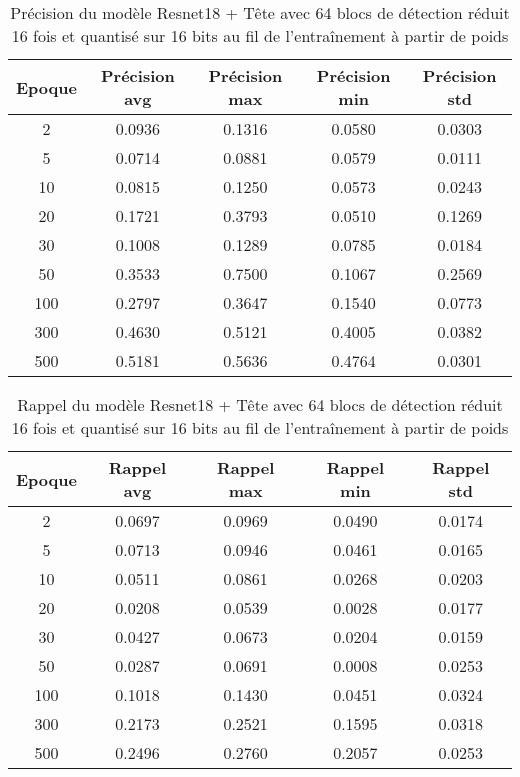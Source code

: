 \begin{table}[!ht]
    \caption{Précision du modèle Resnet18 + Tête avec 64 blocs de détection réduit 16 fois et quantisé sur 16 bits au fil de l'entraînement à partir de poids}
    \label{tab:qresnet18+head_64n_reduced_16x_precision_16b_from_weights}
    \centering
    \begin{tabular}{ |c||c|c|c|c|  }
        \hline
        \rowcolor{gray!50}
        Epoque & Précision avg & Précision max & Précision min & Précision std\\
        \hline
        2 & 0.0936 & 0.1316 & 0.0580 & 0.0303\\
        5 & 0.0714 & 0.0881 & 0.0579 & 0.0111\\
        10 & 0.0815 & 0.1250 & 0.0573 & 0.0243\\
        20 & 0.1721 & 0.3793 & 0.0510 & 0.1269\\
        30 & 0.1008 & 0.1289 & 0.0785 & 0.0184\\
        50 & 0.3533 & 0.7500 & 0.1067 & 0.2569\\
        100 & 0.2797 & 0.3647 & 0.1540 & 0.0773\\
        300 & 0.4630 & 0.5121 & 0.4005 & 0.0382\\
        500 & 0.5181 & 0.5636 & 0.4764 & 0.0301\\
        \hline
    \end{tabular}
\end{table}

\begin{table}[!ht]
    \caption{Rappel du modèle Resnet18 + Tête avec 64 blocs de détection réduit 16 fois et quantisé sur 16 bits au fil de l'entraînement à partir de poids}
    \label{tab:qresnet18+head_64n_reduced_16x_rappel_16b_from_weights}
    \centering
    \begin{tabular}{ |c||c|c|c|c|  }
        \hline
        \rowcolor{gray!50}
        Epoque & Rappel avg & Rappel max & Rappel min & Rappel std\\
        \hline
        2 & 0.0697 & 0.0969 & 0.0490 & 0.0174\\
        5 & 0.0713 & 0.0946 & 0.0461 & 0.0165\\
        10 & 0.0511 & 0.0861 & 0.0268 & 0.0203\\
        20 & 0.0208 & 0.0539 & 0.0028 & 0.0177\\
        30 & 0.0427 & 0.0673 & 0.0204 & 0.0159\\
        50 & 0.0287 & 0.0691 & 0.0008 & 0.0253\\
        100 & 0.1018 & 0.1430 & 0.0451 & 0.0324\\
        300 & 0.2173 & 0.2521 & 0.1595 & 0.0318\\
        500 & 0.2496 & 0.2760 & 0.2057 & 0.0253\\
        \hline
    \end{tabular}
\end{table}

